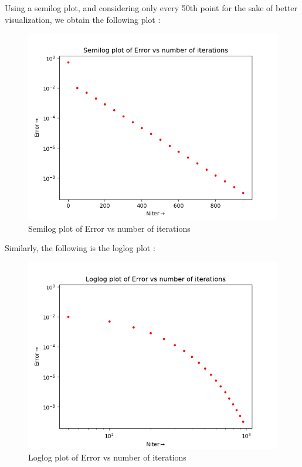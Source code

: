 \documentclass[11pt, a4paper]{article}
\begin{document}
Using a semilog plot, and considering only every 50th point for the sake of better visualization, we obtain the following plot :
\begin{figure}[!htb]
\centering
\includegraphics[scale=0.5]{semilog1.png}
\caption{Semilog plot of Error vs number of iterations}
\label{fig:4}
\end{figure}
\newpage
Similarly, the following is the loglog plot :
\begin{figure}[!htb]
\centering
\includegraphics[scale=0.4]{loglog1.png}
\caption{Loglog plot of Error vs number of iterations}
\label{fig:5}
\end{figure}
 
\end{document}
